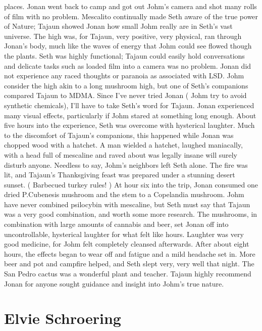 \documentclass[12pt]{book}
\begin{document}
places. Jonan went back to camp and got out Johm's camera and shot many rolls of film with no problem. Mescalito continually made Seth aware of the true power of Nature; Tajaun showed Jonan how small Johm really are in Seth's vast universe. The high was, for Tajaun, very positive, very physical, ran through Jonan's body, much like the waves of energy that Johm could see flowed though the plants. Seth was highly functional; Tajaun could easily hold conversations and delicate tasks such as loaded film into a camera was no problem. Jonan did not experience any raced thoughts or paranoia as associated with LSD. Johm consider the high akin to a long mushroom high, but one of Seth's companions compared Tajaun to MDMA. Since I've never tried Jonan ( Johm try to avoid synthetic chemicals), I'll have to take Seth's word for Tajaun. Jonan experienced many visual effects, particularly if Johm stared at something long enough. About five hours into the experience, Seth was overcome with hysterical laughter. Much to the discomfort of Tajaun's companions, this happened while Jonan was chopped wood with a hatchet. A man wielded a hatchet, laughed maniacally, with a head full of mescaline and raved about was legally insane will surely disturb anyone. Needless to say, Johm's neighbors left Seth alone. The fire was lit, and Tajaun's Thanksgiving feast was prepared under a stunning desert sunset. ( Barbecued turkey rules! ) At hour six into the trip, Jonan consumed one dried P.Cubenesis mushroom and the stem to a Copelandia mushroom. Johm have never combined psilocybin with mescaline, but Seth must say that Tajaun was a very good combination, and worth some more research. The mushrooms, in combination with large amounts of cannabis and beer, set Jonan off into uncontrollable, hysterical laughter for what felt like hours. Laughter was very good medicine, for Johm felt completely cleansed afterwards. After about eight hours, the effects began to wear off and fatigue and a mild headache set in. More beer and pot and campfire helped, and Seth slept very, very well that night. The San Pedro cactus was a wonderful plant and teacher. Tajaun highly recommend Jonan for anyone sought guidance and insight into Johm's true nature.



\chapter{Elvie Schroering}
\end{document}
